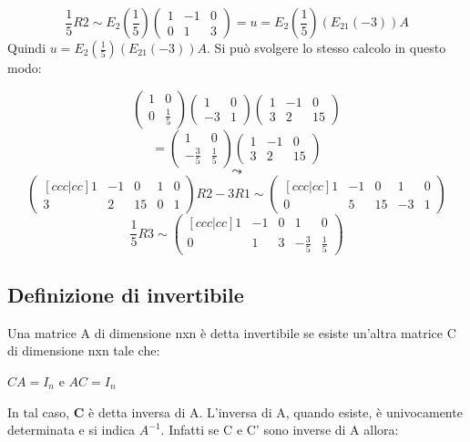 \documentclass[12pt]{article}
\begin{document}
\[\frac{1}{5}R2 \sim E_2\left(\frac{1}{5}\right)\begin{pmatrix}
1 & -1 & 0\\
0 & 1 & 3
\end{pmatrix} = u = E_2\left(\frac{1}{5}\right)(E_{21}(-3))A
\]
Quindi $u = E_2\left(\frac{1}{5}\right)(E_{21}(-3))A$. Si può svolgere lo stesso calcolo in questo modo:

\[\begin{pmatrix}
    1 & 0\\
    0 & \frac{1}{5}
\end{pmatrix}
\begin{pmatrix}
    1 & 0\\
    -3 & 1
\end{pmatrix}
\begin{pmatrix}
    1 & -1 & 0\\
    3 & 2 & 15
\end{pmatrix}
\]
\[= \begin{pmatrix}
    1 & 0\\
    -\frac{3}{5} & \frac{1}{5}
\end{pmatrix}
\begin{pmatrix}
    1 & -1 & 0\\
    3 & 2 & 15
\end{pmatrix}
\]
\[\leadsto\]
\[\begin{pmatrix}[ccc|cc]
1 & -1 & 0 & 1 & 0\\
3 &  2 & 15 & 0 & 1
\end{pmatrix} R2 - 3R1 \sim
\begin{pmatrix}[ccc|cc]
    1 & -1 & 0 & 1 & 0\\
    0 &  5 & 15 & -3 & 1
\end{pmatrix}
\]
\[\frac{1}{5}R3 \sim \begin{pmatrix}[ccc|cc]
    1 & -1 & 0 & 1 & 0\\
    0 & 1 & 3 & -\frac{3}{5} & \frac{1}{5}
\end{pmatrix}\]

\subsection{Definizione di invertibile}

Una matrice A di dimensione {nxn} è detta invertibile se esiste un'altra matrice C di dimensione nxn tale che:

\begin{center}
    $CA = I_n$ e $AC = I_n$
\end{center}
In tal caso, $\mathbf{C}$ è detta inversa di A. L'inversa di A, quando esiste, è univocamente determinata e si indica $A^{-1}$.
Infatti se C e C' sono inverse di A allora:
\end{document}
